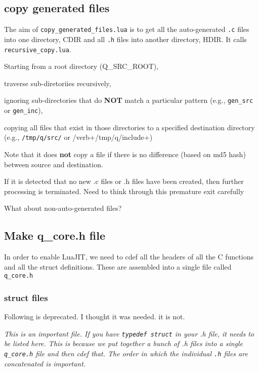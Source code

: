 \subsection{copy generated files}
\label{copy_generated_files}

The aim of {\tt copy\_generated\_files.lua} is to get all the auto-generated 
{\tt .c} files into one directory, CDIR
and all {\tt .h} files into another directory, HDIR. It calls {\tt
recursive\_copy.lua}. 

\bi
\item Starting from a root directory (Q\_SRC\_ROOT), 
\item traverse sub-diretoriies recursively, 
\item ignoring sub-directories that do {\bf NOT} match a particular
pattern (e.g., \verb+gen_src+ or \verb+gen_inc+), 
\item copying all files that exist in
those directories to a specified destination directory (e.g., \verb+/tmp/q/src/+
or /verb+/tmp/q/include+)
\item Note that it does {\bf not} copy a file if there is no difference (based
on md5 hash) between source and destination.
\ei

If it is detected that no new .c files or .h files have been created, then
further processing is terminated. Need to think through this premature exit
carefully \TBC


What about non-auto-generated files? \TBC

\subsection{Make q\_core.h file}
\label{mk_q_core_h}

In order to enable LuaJIT, we need to cdef all the headers of all the C
functions and all the struct definitions. These are assembled into a single file
called \verb+q_core.h+

\subsubsection{struct files}
\label{struct_files}

Following is deprecated. I thought it was needed. it is not.

{\em 
This is an important file. If you have {\tt typedef struct} in your .h file, it
needs to be listed here. This is because we put together a bunch of .h files
into a single {\tt q\_core.h} file and then cdef that. The order in which the individual {\tt .h} files are concatenated is important.

}
